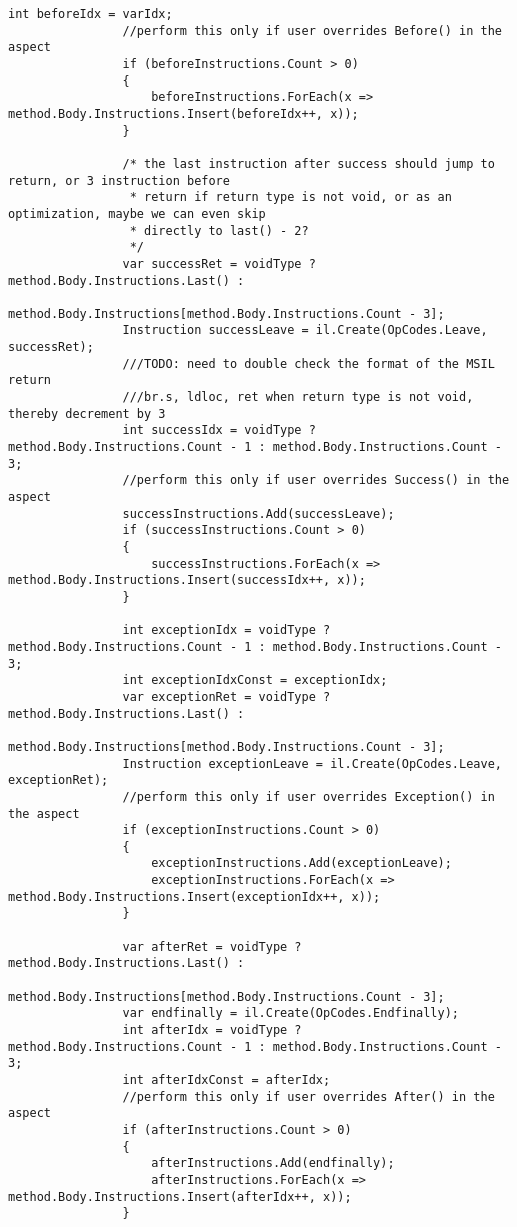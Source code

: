 \begin{lstlisting}[caption={../buffalo/Injectors/MethodBoundaryInjector.cs}, label=../buffalo/Injectors/MethodBoundaryInjector.cs, frame=tb, basicstyle=\scriptsize]
                int beforeIdx = varIdx;
                //perform this only if user overrides Before() in the aspect
                if (beforeInstructions.Count > 0)
                {
                    beforeInstructions.ForEach(x => method.Body.Instructions.Insert(beforeIdx++, x));
                }

                /* the last instruction after success should jump to return, or 3 instruction before
                 * return if return type is not void, or as an optimization, maybe we can even skip
                 * directly to last() - 2?
                 */
                var successRet = voidType ? method.Body.Instructions.Last() :
                    method.Body.Instructions[method.Body.Instructions.Count - 3];
                Instruction successLeave = il.Create(OpCodes.Leave, successRet);
                ///TODO: need to double check the format of the MSIL return
                ///br.s, ldloc, ret when return type is not void, thereby decrement by 3
                int successIdx = voidType ? method.Body.Instructions.Count - 1 : method.Body.Instructions.Count - 3;
                //perform this only if user overrides Success() in the aspect
                successInstructions.Add(successLeave);
                if (successInstructions.Count > 0)
                {
                    successInstructions.ForEach(x => method.Body.Instructions.Insert(successIdx++, x));
                }

                int exceptionIdx = voidType ? method.Body.Instructions.Count - 1 : method.Body.Instructions.Count - 3;
                int exceptionIdxConst = exceptionIdx;
                var exceptionRet = voidType ? method.Body.Instructions.Last() :
                    method.Body.Instructions[method.Body.Instructions.Count - 3];
                Instruction exceptionLeave = il.Create(OpCodes.Leave, exceptionRet);
                //perform this only if user overrides Exception() in the aspect
                if (exceptionInstructions.Count > 0)
                {
                    exceptionInstructions.Add(exceptionLeave);
                    exceptionInstructions.ForEach(x => method.Body.Instructions.Insert(exceptionIdx++, x));
                }

                var afterRet = voidType ? method.Body.Instructions.Last() :
                    method.Body.Instructions[method.Body.Instructions.Count - 3];
                var endfinally = il.Create(OpCodes.Endfinally);
                int afterIdx = voidType ? method.Body.Instructions.Count - 1 : method.Body.Instructions.Count - 3;
                int afterIdxConst = afterIdx;
                //perform this only if user overrides After() in the aspect
                if (afterInstructions.Count > 0)
                {
                    afterInstructions.Add(endfinally);
                    afterInstructions.ForEach(x => method.Body.Instructions.Insert(afterIdx++, x));
                }


\end{lstlisting}
